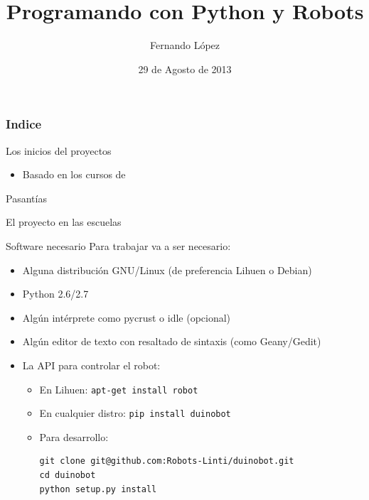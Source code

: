 \documentclass{beamer}[10]
\title{Programando con Python y Robots}
\author{Fernando López}
\institute{LINTI \\ Facultad de Informática \\ Universidad Nacional de la Plata
}
\date{29 de Agosto de 2013}
\begin{document}
\frame{\titlepage \vspace{-0.5cm}

}


\frame
{
\frametitle{Indice}
\tableofcontents[pausesection]
}

\begin{frame}{Los inicios del proyectos}
\begin{itemize}
	\item Basado en los cursos de 
\end{itemize}
\end{frame}
\begin{frame}{Pasantías}
\end{frame}
\begin{frame}{El proyecto en las escuelas}
\end{frame}
\begin{frame}[fragile]{Software necesario}
	Para trabajar va a ser necesario:
	\begin{itemize}[<+->]
		\item Alguna distribución GNU/Linux (de preferencia Lihuen o Debian)
		\item Python 2.6/2.7
		\item Algún intérprete como pycrust o idle (opcional)
		\item Algún editor de texto con resaltado de sintaxis (como Geany/Gedit)
		\item La API para controlar el robot:
			\begin{itemize}
				\item En Lihuen:
\verb+apt-get install robot+
				\item En cualquier distro:
\verb+pip install duinobot+
				\item Para desarrollo:
{\footnotesize
\begin{verbatim}
git clone git@github.com:Robots-Linti/duinobot.git
cd duinobot
python setup.py install
\end{verbatim}
}
			\end{itemize}
	\end{itemize}
\end{frame}
\end{document}
